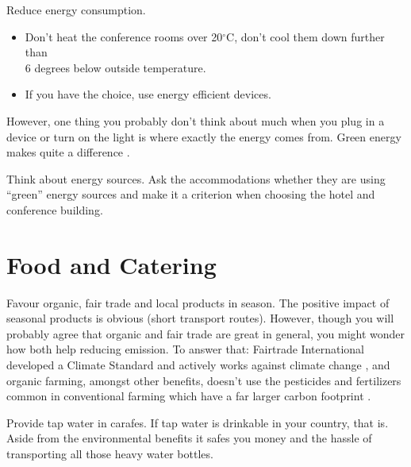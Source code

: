 \begin{suggest}{Reduce energy consumption.}
	\vspace{-2\topsep}
	\begin{itemize}
		\item Don't heat the conference rooms over 20$^\circ$C, don't cool them down further than \\
		6 degrees below outside temperature.
		\item If you have the choice, use energy efficient devices.
	\end{itemize}	
\end{suggest}

However, one thing you probably don't think about much when you plug in a device or turn on the light is where exactly the energy comes from. Green energy makes quite a difference \cite{energy}.

\begin{suggest}{Think about energy sources.}
	Ask the accommodations whether they are using ``green'' energy sources and make it a criterion when choosing the hotel and conference building.
\end{suggest}

\section{Food and Catering}

\begin{suggest}{Favour organic, fair trade and local products in season.}
	The positive impact of seasonal products is obvious (short transport routes). However, though you will probably agree that organic and fair trade are great in general, you might wonder how both help reducing emission. To answer that: Fairtrade International developed a Climate Standard and actively works against climate change \cite{fairtrade}, and organic farming, amongst other benefits, doesn't use the pesticides and fertilizers common in conventional farming which have a far larger carbon footprint \cite{organic}.
\end{suggest}

\begin{suggest}{Provide tap water in carafes.}
	If tap water is drinkable in your country, that is. Aside from the environmental benefits it safes you money and the hassle of transporting all those heavy water bottles.
\end{suggest}

